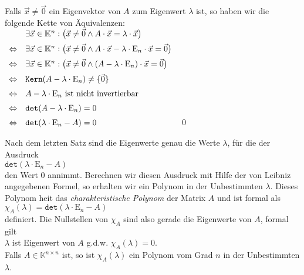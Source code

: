 \proof
Falls $\vec{x} \not= \vec{0}$ ein Eigenvektor von $A$ zum Eigenwert $\lambda$ ist, so haben wir die folgende
Kette von \"Aquivalenzen:
\\[0.2cm]
\hspace*{1.3cm}
$
\begin{array}[b]{lll}
                  & \exists \vec{x} \in \mathbb{K}^n: \bigl(\vec{x} \not=\vec{0} \wedge A \cdot \vec{x}  = \lambda \cdot \vec{x}\bigr) \\[0.2cm]
\Leftrightarrow   & \exists \vec{x} \in \mathbb{K}^n: \bigl(\vec{x} \not=\vec{0} \wedge A \cdot \vec{x} - \lambda \cdot \mathrm{E}_n \cdot \vec{x} = \vec{0}\bigr) \\[0.2cm]
\Leftrightarrow   & \exists \vec{x} \in \mathbb{K}^n: \bigl(\vec{x} \not=\vec{0} \wedge (A - \lambda \cdot \mathrm{E}_n) \cdot \vec{x} = \vec{0}\bigr) \\[0.2cm]
\Leftrightarrow   & \mathtt{Kern}(A - \lambda \cdot \mathrm{E}_n) \not= \{\vec{0}\} \\[0.2cm]
\Leftrightarrow   & \mbox{$A - \lambda \cdot \mathrm{E}_n$ ist nicht invertierbar} \\[0.2cm]
\Leftrightarrow   & \mathtt{det}(A - \lambda \cdot \mathrm{E}_n) = 0  \\[0.2cm]
\Leftrightarrow   & \mathtt{det}(\lambda \cdot \mathrm{E}_n - A) = 0  
\end{array}
$
\qed

Nach dem letzten Satz sind die Eigenwerte genau die Werte $\lambda$, f\"ur die der Ausdruck 
\\[0.2cm]
\hspace*{1.3cm}
 $\mathtt{det}(\lambda \cdot \mathrm{E}_n- A)$
\\[0.2cm]
den Wert $0$ annimmt.  Berechnen wir diesen Ausdruck mit Hilfe der von Leibniz angegebenen Formel,
so erhalten wir ein Polynom in der Unbestimmten $\lambda$.  Dieses Polynom hei\3t das
{\emph{\color{blue}charakteristische Polynom}} der Matrix $A$ und ist formal als
\\[0.2cm]
\hspace*{1.3cm}
$\chi_A(\lambda) = \mathtt{det}(\lambda \cdot \mathrm{E}_n - A)$
\\[0.2cm]
definiert.  Die Nullstellen von $\chi_A$ sind also gerade die Eigenwerte von $A$, formal gilt
\\[0.2cm]
\hspace*{1.3cm}
$\lambda$ ist Eigenwert von $A$ \quad g.d.w. \quad $\chi_A(\lambda) = 0$.  
\\[0.2cm]
Falls $A \in \mathbb{K}^{n \times n}$ ist, so ist $\chi_A(\lambda)$ ein Polynom vom Grad $n$ in der Unbestimmten $\lambda$.


